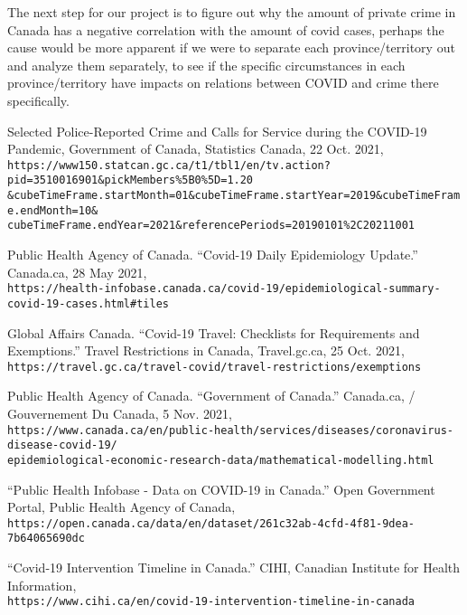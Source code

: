 \documentclass[fontsize=11pt]{article}
\newcommand{\quotes}[1]{``#1''}
\begin{document}
The next step for our project is to figure out why the amount of private crime in Canada has a negative correlation with the amount of covid cases, perhaps the cause would be more apparent if we were to separate each province/territory out and analyze them separately, to see if the specific circumstances in each province/territory have impacts on relations between COVID and crime there specifically. 

\begin{thebibliography}{9}
	Selected Police-Reported Crime and Calls for Service during the COVID-19 Pandemic, Government of Canada, Statistics Canada, 22 Oct. 2021, \\
	\verb+https://www150.statcan.gc.ca/t1/tbl1/en/tv.action?pid=3510016901&pickMembers%5B0%5D=1.20+\\
	\verb+&cubeTimeFrame.startMonth=01&cubeTimeFrame.startYear=2019&cubeTimeFrame.endMonth=10&+\\
	\verb+cubeTimeFrame.endYear=2021&referencePeriods=20190101%2C20211001+

	Public Health Agency of Canada. \quotes{Covid-19 Daily Epidemiology Update.} Canada.ca, 28 May 2021,\\
	\verb+https://health-infobase.canada.ca/covid-19/epidemiological-summary-covid-19-cases.html#tiles+

	Global Affairs Canada. \quotes{Covid-19 Travel: Checklists for Requirements and Exemptions.} Travel Restrictions in Canada,  Travel.gc.ca, 25 Oct. 2021,\\
	\verb+https://travel.gc.ca/travel-covid/travel-restrictions/exemptions+

	Public Health Agency of Canada. \quotes{Government of Canada.} Canada.ca, / Gouvernement Du Canada, 5 Nov. 2021,\\
	\verb+https://www.canada.ca/en/public-health/services/diseases/coronavirus-disease-covid-19/+\\
	\verb+epidemiological-economic-research-data/mathematical-modelling.html+

	\quotes{Public Health Infobase - Data on COVID-19 in Canada.} Open Government Portal, Public Health Agency of Canada,\\
	\verb+https://open.canada.ca/data/en/dataset/261c32ab-4cfd-4f81-9dea-7b64065690dc+

	\quotes{Covid-19 Intervention Timeline in Canada.} CIHI, Canadian Institute for Health Information,\\
	\verb+https://www.cihi.ca/en/covid-19-intervention-timeline-in-canada+



\end{thebibliography}
\end{document}

